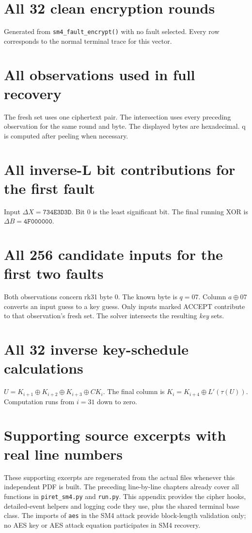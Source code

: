 \documentclass[11pt,a4paper]{report}
\newcommand{\hx}[1]{\texttt{#1}}
\newcommand{\xor}{\mathbin{\oplus}}
\begin{document}



\appendix
\chapter{All 32 clean encryption rounds}
Generated from \texttt{sm4\_fault\_encrypt()} with no fault selected. Every row corresponds to the normal terminal trace for this vector.


\chapter{All observations used in full recovery}
The fresh set uses one ciphertext pair. The intersection uses every preceding observation for the same round and byte. The displayed bytes are hexadecimal. q is computed after peeling when necessary.


\chapter{All inverse-L bit contributions for the first fault}
Input \(\Delta X=\hx{734E3D3D}\). Bit 0 is the least significant bit. The final running XOR is \(\Delta B=\hx{4F000000}\).


\chapter{All 256 candidate inputs for the first two faults}
Both observations concern rk31 byte 0. The known byte is \(q=07\). Column \(a\xor07\) converts an input guess to a key guess. Only inputs marked ACCEPT contribute to that observation's fresh set. The solver intersects the resulting \emph{key} sets.


\chapter{All 32 inverse key-schedule calculations}
\(U=K_{i+1}\xor K_{i+2}\xor K_{i+3}\xor CK_i\). The final column is \(K_i=K_{i+4}\xor L'(\tau(U))\). Computation runs from \(i=31\) down to zero.


\chapter{Supporting source excerpts with real line numbers}
These supporting excerpts are regenerated from the actual files whenever this independent PDF is built. The preceding line-by-line chapters already cover all functions in \texttt{piret\_sm4.py} and \texttt{run.py}. This appendix provides the cipher hooks, detailed-event helpers and logging code they use, plus the shared terminal base class. The imports of \texttt{aes} in the SM4 attack provide block-length validation only; no AES key or AES attack equation participates in SM4 recovery.
\end{document}

